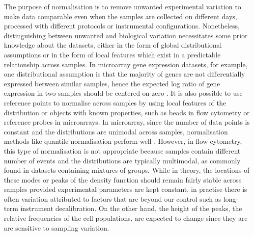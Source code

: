 The purpose of normalisation is to remove unwanted experimental variation to make data comparable even when the samples are
collected on different days, processed with different protocols or instrumental configurations.
Nonetheless, distinguishing between unwanted and biological variation necessitates some prior knowledge about the datasets,
either in the form of global distributional assumptions or in the form of local features which exist in a predictable relationship across samples.
In microarray gene expression datasets, for example, one distributional assumption is that the majority of genes are not differentially expressed between similar samples,
hence the expected log ratio of gene expression in two samples should be centered on zero \citep{Smyth:2003ie,Bolstad:2003ia}.  
It is also possible to use reference points to normalise across samples
by using local features of the distribution or objects with known properties, such as beads in flow cytometry or reference probes in microarrays.
In microarray, since the number of data points is constant and the distributions are unimodal across samples,
normalisation methods like quantile normalisation perform well \citep{Bolstad:2003ia}.
However, in flow cytometry, this type of normalisation is not appropriate because samples contain different number of events and 
the distributions are typically multimodal, as commonly found in datasets containing mixtures of groups.
While in theory, the locations of these modes or peaks of the density function should remain fairly stable across samples provided experimental parameters are kept constant,
in practise there is often variation attributed to factors that are beyond our control such as long-term instrument decalibration.
On the other hand, the height of the peaks, the relative frequencies of the cell populations, are expected to change since they are
are sensitive to sampling variation.
